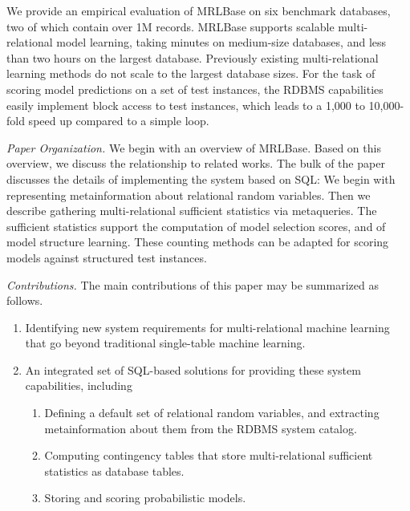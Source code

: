 \documentclass{acm_proc_article-sp}
\begin{document}


We provide an empirical evaluation of MRLBase on six benchmark databases, two of which contain over 1M records. 
MRLBase supports scalable multi-relational model learning, taking minutes on medium-size databases, and less than two hours on the largest database. Previously existing multi-relational learning methods do not scale to the largest database sizes. 
For the task of scoring model predictions on a set of test instances, the RDBMS capabilities easily implement block access to test instances, which leads to a 1,000 to 10,000-fold speed up compared to a simple loop.

{\em Paper Organization.} We begin with an overview of MRLBase. Based on this overview, we discuss the relationship to related works. The bulk of the paper discusses the details of implementing the system based on SQL: We begin with representing metainformation about relational random variables. Then we describe gathering multi-relational sufficient statistics via metaqueries. The sufficient statistics support the computation of model selection scores, and of model structure learning. These counting methods can be adapted for scoring models against   structured test instances. 

{\em Contributions.} The main contributions of this paper may be summarized as follows.

\begin{enumerate}
\item Identifying new system requirements for multi-relational machine learning that go beyond traditional single-table machine learning.
\item An integrated set of SQL-based solutions for providing these system capabilities, including 
\begin{enumerate}
\item Defining a default set of relational random variables, and extracting metainformation about them from the RDBMS system catalog.
\item Computing contingency tables that store multi-relational sufficient statistics as database tables.
\item Storing and scoring probabilistic models.
\end{enumerate}

\end{enumerate}
\end{document}
